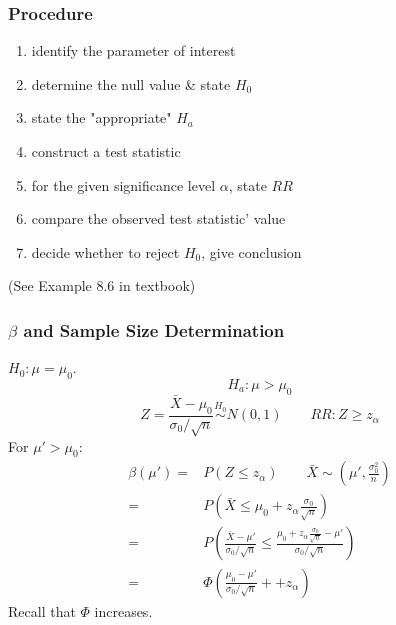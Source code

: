 \noindent{}

\subsubsection{Procedure}
\begin{enumerate}
\item identify the parameter of interest
\item determine the null value \& state $H_0$
\item state the "appropriate" $H_a$
\item construct a test statistic
\item for the given significance level $\alpha$, state $RR$
\item compare the observed test statistic' value
\item decide whether to reject $H_0$, give conclusion
\end{enumerate}


\begin{exmp}
(See Example 8.6 in textbook)
\end{exmp}

\subsubsection{$\beta$ and Sample Size Determination}
$H_0:\mu=\mu_0$. 
\[H_a:\mu >\mu_0\]
\[Z=\frac{\bar{X}-\mu_0}{\sigma_0/\sqrt{n}}\overset{H_0}{\sim} N(0,1) \qquad RR: Z\geq z_{\alpha}\]
For $\mu'>\mu_0$: 
\begin{align*}
\beta(\mu')= & P(Z\leq z_{\alpha}) \qquad \bar{X}\sim \left(\mu',\frac{\sigma_0^2}{n}\right) \\
= & P\left(\bar{X}\leq \mu_0+z_{\alpha}\frac{\sigma_0}{\sqrt{n}}\right) \\
= & P\left( \frac{\bar{X}-\mu'}{\sigma_0/\sqrt{n}} \leq \frac{\mu_0+z_{\alpha} \frac{\sigma_0}{\sqrt{n}}-\mu'}	{\sigma_0/\sqrt{n} } \right) \\
= & \Phi\left( \frac{\mu_0-\mu'}	{\sigma_0/\sqrt{n} }++z_{\alpha}  \right)
\end{align*}
Recall that $\Phi$ increases.

